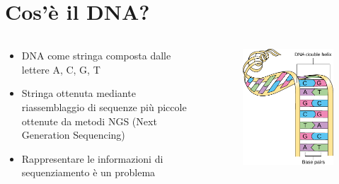 \documentclass{beamer}
\begin{document}
\section{Cos'è il DNA?}
\begin{frame}{\secname}

	\begin{columns}[onlytextwidth]
		\begin{column}{0.6\textwidth}
			\begin{itemize}
				\item DNA come stringa composta dalle lettere A, C, G, T
		    
				\item Stringa ottenuta mediante riassemblaggio di sequenze più piccole
					ottenute da metodi NGS (Next Generation Sequencing)
		    	   
				\item Rappresentare le informazioni di sequenziamento è un problema
			\end{itemize}
		\end{column}    
		
		\begin{column}{0.4\textwidth}
			\begin{figure}
				\includegraphics[scale=0.45]{dna}
			\end{figure}
		\end{column}
	\end{columns}
\end{frame}
 
\end{document}
